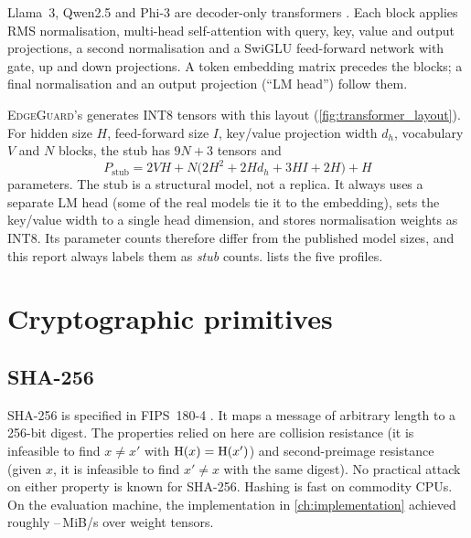 Llama~3, Qwen2.5 and Phi-3 are decoder-only transformers \cite{vaswani2017attention,
llama3herd,qwen25report,phi3report}. Each block applies RMS normalisation, multi-head
self-attention with query, key, value and output projections, a second normalisation and a
SwiGLU feed-forward network with gate, up and down projections. A token embedding matrix
precedes the blocks; a final normalisation and an output projection (``LM head'') follow them.

\textsc{EdgeGuard}'s  generates INT8 tensors with this layout
(\cref{fig:transformer_layout}). For hidden size $H$, feed-forward size $I$, key/value
projection width $d_h$, vocabulary $V$ and $N$ blocks, the stub has $9N+3$ tensors and
\begin{equation}
  P_{\text{stub}} = 2VH + N\big(2H^2 + 2Hd_h + 3HI + 2H\big) + H
  \label{eq:stub_params}
\end{equation}
parameters. The stub is a structural model, not a replica. It always uses a separate LM head
(some of the real models tie it to the embedding), sets the key/value width to a single head
dimension, and stores normalisation weights as INT8. Its parameter counts therefore differ from
the published model sizes, and this report always labels them as \emph{stub} counts.
 lists the five profiles.

\begin{table}[t]
\centering
\caption{Stub profiles. Dimensions follow the named models; parameter counts are those of the
stub per \cref{eq:stub_params} and are \emph{not} the official model sizes.}
\label{tab:profiles}
\small

\end{table}

\section{Cryptographic primitives}
\label{sec:bg:crypto}

\subsection{SHA-256}
SHA-256 is specified in FIPS~180-4 \cite{fips180-4}. It maps a message of arbitrary length to a
256-bit digest. The properties relied on here are collision resistance (it is infeasible to
find $x\neq x'$ with $\mathrm{H}(x)=\mathrm{H}(x')$) and second-preimage resistance (given $x$, it is
infeasible to find $x'\neq x$ with the same digest). No practical attack on either property is
known for SHA-256. Hashing is fast on commodity CPUs. On the evaluation machine, the
implementation in \cref{ch:implementation} achieved roughly \MerkThrMin{}--\MerkThrMax{}\,MiB/s over
weight tensors.

